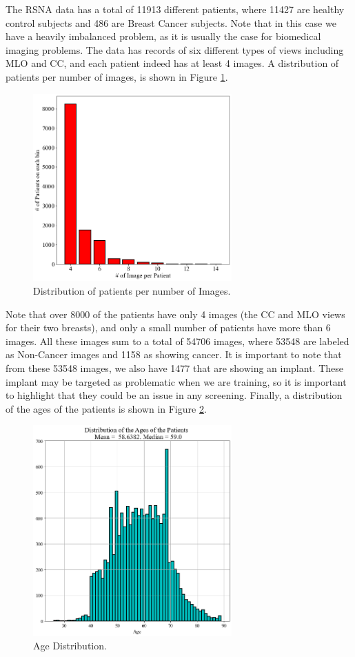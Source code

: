 \documentclass[conference]{IEEEtran}
\begin{document}
The RSNA data has a total of 11913 different patients, where 11427 are healthy control subjects and 486 are Breast Cancer subjects. Note that in this case we have a heavily imbalanced problem, as it is usually the case for biomedical imaging problems. The data has records of six different types of views including MLO and CC, and each patient indeed has at least 4 images. A distribution of patients per number of images, is shown in Figure \ref{fig:image_dist}. 

\begin{figure}[ht]
\centering
\includegraphics[width=3in]{images_dist}
\caption{Distribution of patients per number of Images.}
\label{fig:image_dist}
\end{figure}

Note that over 8000 of the patients have only 4 images (the CC and MLO views for their two breasts), and only a small number of patients have more than 6 images. All these images sum to a total of 54706 images, where 53548 are labeled as Non-Cancer images and 1158 as showing cancer. It is important to note that from these 53548 images, we also have 1477 that are showing an implant. These implant may be targeted as problematic when we are training, so it is important to highlight that they could be an issue in any screening. Finally, a distribution of the ages of the patients is shown in Figure \ref{fig:ages}.


\begin{figure}[ht]
\centering
\includegraphics[width=3in]{age_distributions}
\caption{Age Distribution. }
\label{fig:ages}
\end{figure}
\end{document}
